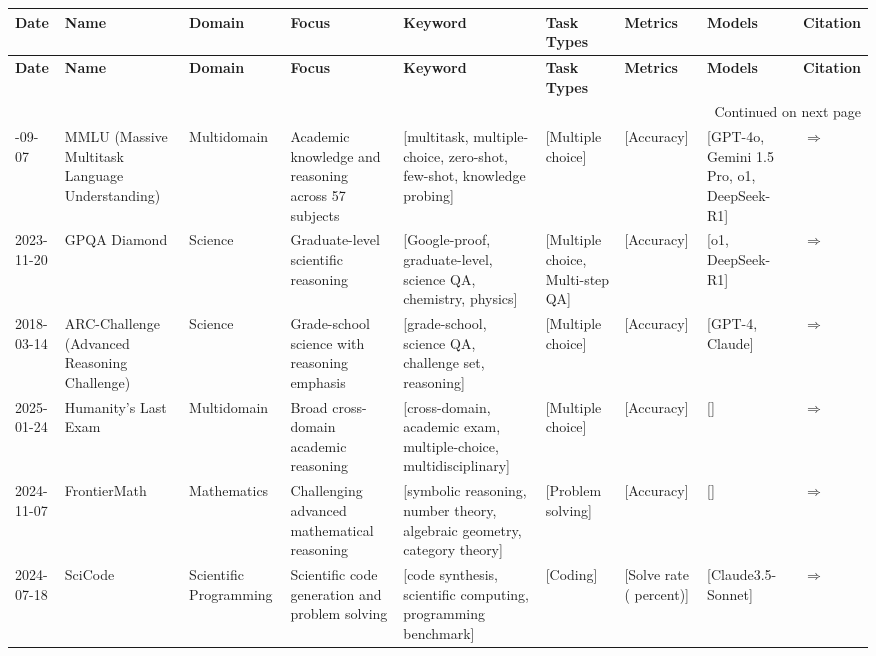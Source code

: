 \documentclass{article}
\begin{document}
\begin{landscape}
{\footnotesize
\begin{longtable}{|p{1.5cm}|p{2.5cm}|p{2cm}|p{2cm}|p{2.5cm}|p{3cm}|p{2cm}|p{2cm}|p{1cm}|}
\hline
{\bf Date} & {\bf Name} & {\bf Domain} & {\bf Focus} & {\bf Keyword} & {\bf Task Types} & {\bf Metrics} & {\bf Models} & {\bf Citation} \\ \hline
\endfirsthead
\hline
{\bf Date} & {\bf Name} & {\bf Domain} & {\bf Focus} & {\bf Keyword} & {\bf Task Types} & {\bf Metrics} & {\bf Models} & {\bf Citation} \\ \hline
\endhead
\hline
\multicolumn{9}{r}{Continued on next page} \\
\endfoot
\hline
\endlastfoot
2020-09-07 & MMLU (Massive Multitask Language Understanding) & Multidomain & Academic knowledge and reasoning across 57 subjects & [multitask, multiple-choice, zero-shot, few-shot, knowledge probing] & [Multiple choice] & [Accuracy] & [GPT-4o, Gemini 1.5 Pro, o1, DeepSeek-R1] & \cite{hendrycks2021measuring} \href{https://arxiv.org/abs/2009.03300}{$\Rightarrow$ } \\ \hline
2023-11-20 & GPQA Diamond & Science & Graduate-level scientific reasoning & [Google-proof, graduate-level, science QA, chemistry, physics] & [Multiple choice, Multi-step QA] & [Accuracy] & [o1, DeepSeek-R1] & \cite{rein2023gpqagraduatelevelgoogleproofqa} \href{https://arxiv.org/abs/2311.12022}{$\Rightarrow$ } \\ \hline
2018-03-14 & ARC-Challenge (Advanced Reasoning Challenge) & Science & Grade-school science with reasoning emphasis & [grade-school, science QA, challenge set, reasoning] & [Multiple choice] & [Accuracy] & [GPT-4, Claude] & \cite{clark2018think} \href{https://allenai.org/data/arc}{$\Rightarrow$ } \\ \hline
2025-01-24 & Humanity's Last Exam & Multidomain & Broad cross-domain academic reasoning & [cross-domain, academic exam, multiple-choice, multidisciplinary] & [Multiple choice] & [Accuracy] & [] & \cite{phan2025humanitys} \href{https://arxiv.org/abs/2501.14249}{$\Rightarrow$ } \\ \hline
2024-11-07 & FrontierMath & Mathematics & Challenging advanced mathematical reasoning & [symbolic reasoning, number theory, algebraic geometry, category theory] & [Problem solving] & [Accuracy] & [] & \cite{glazer2024frontiermath} \href{https://arxiv.org/abs/2411.04872}{$\Rightarrow$ } \\ \hline
2024-07-18 & SciCode & Scientific Programming & Scientific code generation and problem solving & [code synthesis, scientific computing, programming benchmark] & [Coding] & [Solve rate ( percent)] & [Claude3.5-Sonnet] & \cite{tian2024scicode} \href{https://arxiv.org/abs/2407.13168}{$\Rightarrow$ } \\ \hline

\end{longtable}}
\end{landscape}
\end{document}
